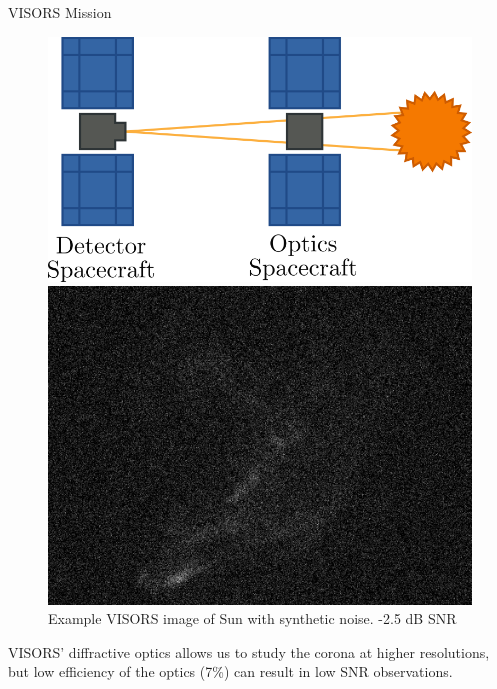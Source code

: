 \documentclass[final]{beamer}
\newlength{\colwidth}
\begin{document}
\begin{frame}[t]
\begin{columns}[t]
\begin{column}{\colwidth}
\begin{block}{ VISORS Mission}
    \begin{figure}[ht]
        \begin{minipage}[b]{0.45\linewidth}
            \centering
            \includegraphics[width=\textwidth]{figures/visors.png}
            \caption{VISORS consists of two spacecraft, holding optics and a detector}
            \label{fig:a}
        \end{minipage}
        \hspace{0.5cm}
        \begin{minipage}[b]{0.45\linewidth}
            \centering
            \includegraphics[width=\textwidth]{figures/sample.png}
            \caption{Example VISORS image of Sun with synthetic noise. -2.5 dB SNR}
            \label{fig:b}
        \end{minipage}
    \end{figure}

    VISORS' diffractive optics allows us to study the corona at higher resolutions, but low efficiency of the optics (7\%) can result in low SNR observations.


\end{block}
\end{column}
\end{columns}
\end{frame}
\end{document}
